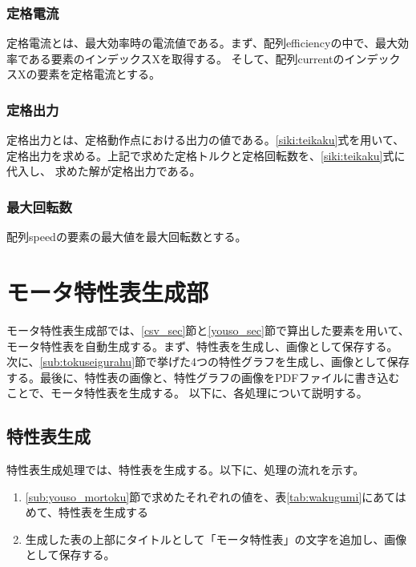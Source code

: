 \subsubsection{定格電流}\label{sub:sub:teikakuden}
定格電流とは、最大効率時の電流値である。まず、配列efficiencyの中で、最大効率である要素のインデックスXを取得する。
そして、配列currentのインデックスXの要素を定格電流とする。

\subsubsection{定格出力}\label{sub:sub:teikakusyutu}
定格出力とは、定格動作点における出力の値である。\ref{siki:teikaku}式を用いて、定格出力を求める。上記で求めた定格トルクと定格回転数を、\ref{siki:teikaku}式に代入し、
求めた解が定格出力である。

\subsubsection{最大回転数}\label{sub:sub:saidaikai}
配列speedの要素の最大値を最大回転数とする。

\section{モータ特性表生成部}\label{mortoku_sec}
モータ特性表生成部では、\ref{csv_sec}節と\ref{youso_sec}節で算出した要素を用いて、モータ特性表を自動生成する。まず、特性表を生成し、画像として保存する。
次に、\ref{sub:tokuseigurahu}節で挙げた4つの特性グラフを生成し、画像として保存する。最後に、特性表の画像と、特性グラフの画像をPDFファイルに書き込むことで、モータ特性表を生成する。
以下に、各処理について説明する。

\subsection{特性表生成}\label{sub:mortortoku}

特性表生成処理では、特性表を生成する。以下に、処理の流れを示す。
\begin{enumerate}
    \item \ref{sub:youso_mortoku}節で求めたそれぞれの値を、表\ref{tab:wakugumi}にあてはめて、特性表を生成する
    \item 生成した表の上部にタイトルとして「モータ特性表」の文字を追加し、画像として保存する。
\end{enumerate}

